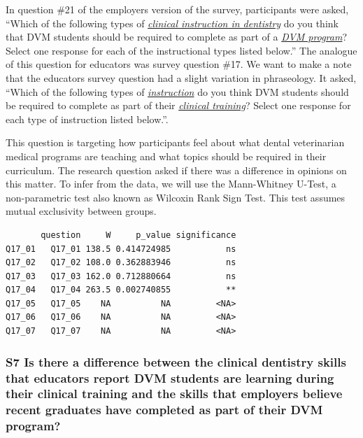 \documentclass[
  11pt,
  letterpaper,
  DIV=11,
  numbers=noendperiod]{scrartcl}
\numberwithin{figure}{section}
\begin{document}
In question \#21 of the employers version of the survey, participants
were asked, ``Which of the following types of \ul{\emph{clinical
instruction in dentistry}} do you think that DVM students should be
required to complete as part of a \ul{\emph{DVM program}}? Select one
response for each of the instructional types listed below.'' The
analogue of this question for educators was survey question \#17. We
want to make a note that the educators survey question had a slight
variation in phraseology. It asked, ``Which of the following types of
\ul{\emph{instruction}} do you think DVM students should be required to
complete as part of their \ul{\emph{clinical training}}? Select one
response for each type of instruction listed below.''.

This question is targeting how participants feel about what dental
veterinarian medical programs are teaching and what topics should be
required in their curriculum. The research question asked if there was a
difference in opinions on this matter. To infer from the data, we will
use the Mann-Whitney U-Test, a non-parametric test also known as
Wilcoxin Rank Sign Test. This test assumes mutual exclusivity between
groups.

\begin{verbatim}
       question     W     p_value significance
Q17_01   Q17_01 138.5 0.414724985           ns
Q17_02   Q17_02 108.0 0.362883946           ns
Q17_03   Q17_03 162.0 0.712880664           ns
Q17_04   Q17_04 263.5 0.002740855           **
Q17_05   Q17_05    NA          NA         <NA>
Q17_06   Q17_06    NA          NA         <NA>
Q17_07   Q17_07    NA          NA         <NA>
\end{verbatim}

\hypertarget{s7-is-there-a-difference-between-the-clinical-dentistry-skills-that-educators-report-dvm-students-are-learning-during-their-clinical-training-and-the-skills-that-employers-believe-recent-graduates-have-completed-as-part-of-their-dvm-program}{%
\subsubsection{S7 Is there a difference between the clinical dentistry
skills that educators report DVM students are learning during their
clinical training and the skills that employers believe recent graduates
have completed as part of their DVM
program?}\label{s7-is-there-a-difference-between-the-clinical-dentistry-skills-that-educators-report-dvm-students-are-learning-during-their-clinical-training-and-the-skills-that-employers-believe-recent-graduates-have-completed-as-part-of-their-dvm-program}}
\end{document}
